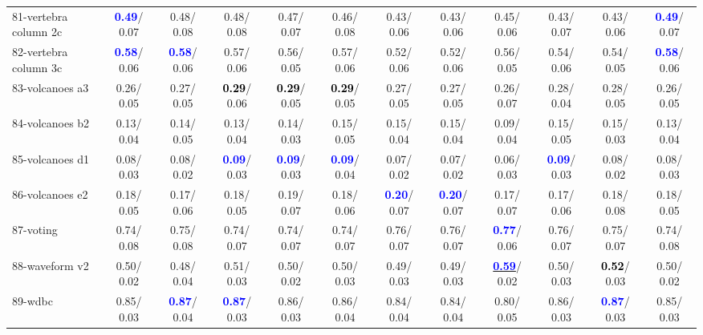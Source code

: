 \begin{table}[h]
\begin{center}
{\begin{tabular}{lc|c|c|c|c|c|c|c|c|c|c}
81-vertebra column 2c & \textcolor{blue}{\textbf{  0.49}}/  0.07 &   0.48/  0.08 &   0.48/  0.08 &   0.47/  0.07 &   0.46/  0.08 &   0.43/  0.06 &   0.43/  0.06 &   0.45/  0.06 &   0.43/  0.07 &   0.43/  0.06 & \textcolor{blue}{\textbf{  0.49}}/  0.07 \\
82-vertebra column 3c & \textcolor{blue}{\textbf{  0.58}}/  0.06 & \textcolor{blue}{\textbf{  0.58}}/  0.06 &   0.57/  0.06 &   0.56/  0.05 &   0.57/  0.06 &   0.52/  0.06 &   0.52/  0.06 &   0.56/  0.05 &   0.54/  0.06 &   0.54/  0.05 & \textcolor{blue}{\textbf{  0.58}}/  0.06 \\
83-volcanoes a3 &   0.26/  0.05 &   0.27/  0.05 & \textcolor{black}{\textbf{  0.29}}/  0.06 & \textcolor{black}{\textbf{  0.29}}/  0.05 & \textcolor{black}{\textbf{  0.29}}/  0.05 &   0.27/  0.05 &   0.27/  0.05 &   0.26/  0.07 &   0.28/  0.04 &   0.28/  0.05 &   0.26/  0.05 \\
84-volcanoes b2 &   0.13/  0.04 &   0.14/  0.05 &   0.13/  0.04 &   0.14/  0.03 &   0.15/  0.05 &   0.15/  0.04 &   0.15/  0.04 &   0.09/  0.04 &   0.15/  0.05 &   0.15/  0.03 &   0.13/  0.04 \\
85-volcanoes d1 &   0.08/  0.03 &   0.08/  0.02 & \textcolor{blue}{\textbf{  0.09}}/  0.03 & \textcolor{blue}{\textbf{  0.09}}/  0.03 & \textcolor{blue}{\textbf{  0.09}}/  0.04 &   0.07/  0.02 &   0.07/  0.02 &   0.06/  0.03 & \textcolor{blue}{\textbf{  0.09}}/  0.03 &   0.08/  0.02 &   0.08/  0.03 \\ \hline
86-volcanoes e2 &   0.18/  0.05 &   0.17/  0.06 &   0.18/  0.05 &   0.19/  0.07 &   0.18/  0.06 & \textcolor{blue}{\textbf{  0.20}}/  0.07 & \textcolor{blue}{\textbf{  0.20}}/  0.07 &   0.17/  0.07 &   0.17/  0.06 &   0.18/  0.08 &   0.18/  0.05 \\
87-voting &   0.74/  0.08 &   0.75/  0.08 &   0.74/  0.07 &   0.74/  0.07 &   0.74/  0.07 &   0.76/  0.07 &   0.76/  0.07 & \textcolor{blue}{\textbf{  0.77}}/  0.06 &   0.76/  0.07 &   0.75/  0.07 &   0.74/  0.08 \\
88-waveform v2 &   0.50/  0.02 &   0.48/  0.04 &   0.51/  0.03 &   0.50/  0.02 &   0.50/  0.03 &   0.49/  0.03 &   0.49/  0.03 & \underline{\textcolor{blue}{\textbf{  0.59}}}/  0.02 &   0.50/  0.03 & \textcolor{black}{\textbf{  0.52}}/  0.03 &   0.50/  0.02 \\
89-wdbc &   0.85/  0.03 & \textcolor{blue}{\textbf{  0.87}}/  0.04 & \textcolor{blue}{\textbf{  0.87}}/  0.03 &   0.86/  0.03 &   0.86/  0.04 &   0.84/  0.04 &   0.84/  0.04 &   0.80/  0.05 &   0.86/  0.03 & \textcolor{blue}{\textbf{  0.87}}/  0.03 &   0.85/  0.03 \\

\end{tabular}}
\end{center}
\end{table}
